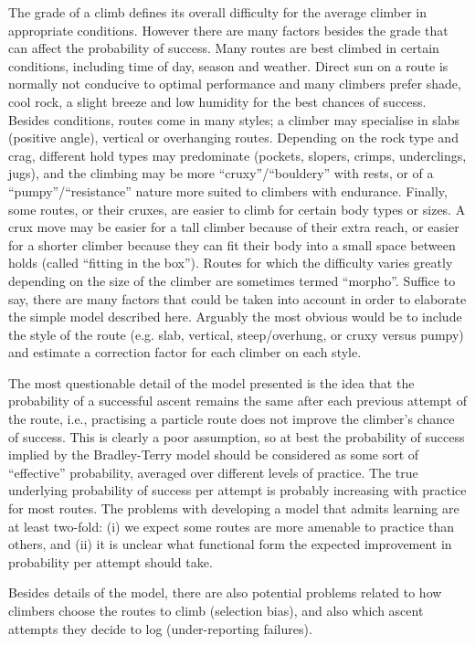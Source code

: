 \documentclass[ba]{imsart}
\begin{document}
The grade of a climb defines its overall difficulty for the average climber in appropriate conditions. However there are many factors besides the grade that can affect the probability of success. Many routes are best climbed in certain conditions, including time of day, season and weather. Direct sun on a route is normally not conducive to optimal performance and many climbers prefer shade, cool rock, a slight breeze and low humidity for the best chances of success. Besides conditions, routes come in many styles; a climber may specialise in slabs (positive angle), vertical or overhanging routes. Depending on the rock type and crag, different hold types may predominate (pockets, slopers, crimps, underclings, jugs), and the climbing may be more ``cruxy''/``bouldery'' with rests, or of a ``pumpy''/``resistance'' nature more suited to climbers with endurance. Finally, some routes, or their cruxes, are easier to climb for certain body types or sizes. A crux move may be easier for a tall climber because of their extra reach, or easier for a shorter climber because they can fit their body into a small space between holds (called ``fitting in the box''). Routes for which the difficulty varies greatly depending on the size of the climber are sometimes termed ``morpho''. Suffice to say, there are many factors that could be taken into account in order to elaborate the simple model described here. Arguably the most obvious would be to include the style of the route (e.g. slab, vertical, steep/overhung, or cruxy versus pumpy) and estimate a correction factor for each climber on each style.

The most questionable detail of the model presented is the idea that the probability of a successful ascent remains the same after each previous attempt of the route, i.e., practising a particle route does not improve the climber's chance of success. This is clearly a poor assumption, so at best the probability of success implied by the Bradley-Terry model should be considered as some sort of ``effective'' probability, averaged over different levels of practice. The true underlying probability of success per attempt is probably increasing with practice for most routes. The problems with developing a model that admits learning are at least two-fold: (i) we expect some routes are more amenable to practice than others, and (ii) it is unclear what functional form the expected improvement in probability per attempt should take.

Besides details of the model, there are also potential problems related to how climbers choose the routes to climb (selection bias), and also which ascent attempts they decide to log (under-reporting failures).
\end{document}
